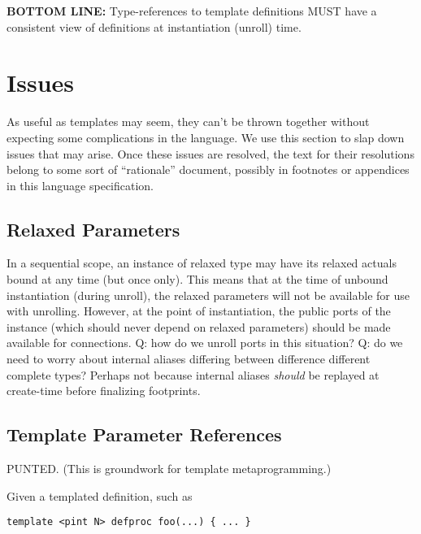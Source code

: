 \textbf{BOTTOM LINE:}
Type-references to template definitions MUST have a consistent
view of definitions at instantiation (unroll) time.  

\section{Issues}
\label{sec:templates:issues}

As useful as templates may seem, they can't be thrown together without
expecting some complications in the language.  
We use this section to slap down issues that may arise.  
Once these issues are resolved, the text for their resolutions
belong to some sort of ``rationale'' document, possibly
in footnotes or appendices in this language specification.  

\subsection{Relaxed Parameters}
\label{sec:templates:issues:relaxed}

In a sequential scope, an instance of relaxed type
may have its relaxed actuals bound at any time (but once only).  
This means that at the time of unbound instantiation (during unroll), 
the relaxed parameters will not be available for use with unrolling.
However, at the point of instantiation, the public ports
of the instance (which should never depend on relaxed parameters)
should be made available for connections.  
Q: how do we unroll ports in this situation?
Q: do we need to worry about internal aliases differing between
difference different complete types?  Perhaps not because internal
aliases \emph{should} be replayed at create-time before
finalizing footprints.  

\subsection{Template Parameter References}
\label{sec:templates:issues:param_ref}

PUNTED.  (This is groundwork for template metaprogramming.)

Given a templated definition, such as

\begin{verbatim}
template <pint N> defproc foo(...) { ... }
\end{verbatim}


